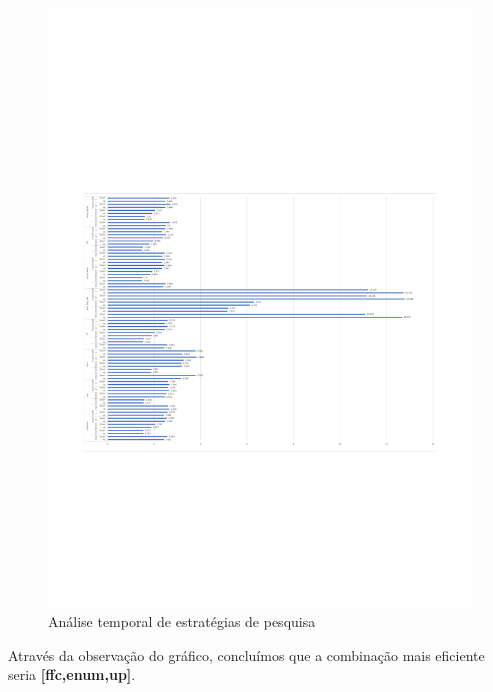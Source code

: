 \begin{figure}
    \centering
    \includegraphics{heuristics.pdf}
    \caption{Análise temporal de estratégias de pesquisa}
    \label{fig: searchstrategy}
\end{figure}

Através da observação do gráfico, concluímos que a combinação mais eficiente seria \textbf{[ffc,enum,up]}.